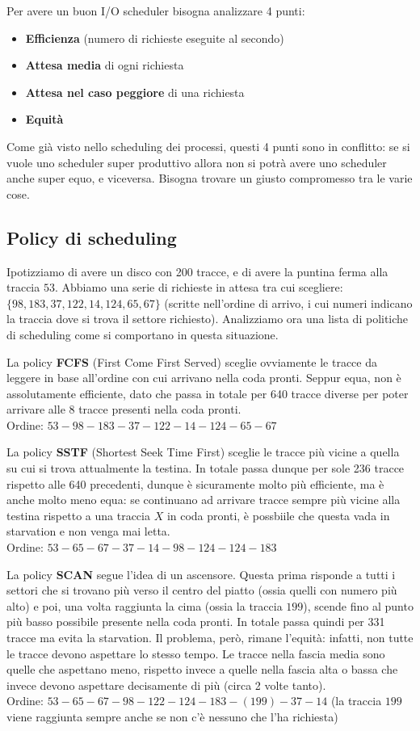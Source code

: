 \documentclass[11pt, a4paper, titlepage, oneside]{scrbook}
\begin{document}
Per avere un buon I/O scheduler bisogna analizzare 4 punti:
\begin{itemize}
    \item \textbf{Efficienza} (numero di richieste eseguite al secondo)
    \item \textbf{Attesa media} di ogni richiesta
    \item \textbf{Attesa nel caso peggiore} di una richiesta
    \item \textbf{Equità}
\end{itemize}

Come già visto nello scheduling dei processi, questi 4 punti sono in conflitto: se si vuole uno scheduler super produttivo allora non si potrà avere uno scheduler anche super equo, e viceversa. Bisogna trovare un giusto compromesso tra le varie cose. 

\subsection{Policy di scheduling}

Ipotizziamo di avere un disco con 200 tracce, e di avere la puntina ferma alla traccia $53$. Abbiamo una serie di richieste in attesa tra cui scegliere: $\{98,183,37,122,14,124,65,67\}$ (scritte nell'ordine di arrivo, i cui numeri indicano la traccia dove si trova il settore richiesto). Analizziamo ora una lista di politiche di scheduling come si comportano in questa situazione.

La policy \textbf{FCFS} (First Come First Served) sceglie ovviamente le tracce da leggere in base all'ordine con cui arrivano nella coda pronti. Seppur equa, non è assolutamente efficiente, dato che passa in totale per 640 tracce diverse per poter arrivare alle 8 tracce presenti nella coda pronti. \\
Ordine: $53-98-183-37-122-14-124-65-67$

La policy \textbf{SSTF} (Shortest Seek Time First) sceglie le tracce più vicine a quella su cui si trova attualmente la testina. In totale passa dunque per sole 236 tracce rispetto alle 640 precedenti, dunque è sicuramente molto più efficiente, ma è anche molto meno equa: se continuano ad arrivare tracce sempre più vicine alla testina rispetto a una traccia $X$ in coda pronti, è possbiile che questa vada in starvation e non venga mai letta.\\
Ordine: $53-65-67-37-14-98-124-124-183$

La policy \textbf{SCAN} segue l'idea di un ascensore. Questa prima risponde a tutti i settori che si trovano più verso il centro del piatto (ossia quelli con numero più alto) e poi, una volta raggiunta la cima (ossia la traccia $199$), scende fino al punto più basso possibile presente nella coda pronti. In totale passa quindi per 331 tracce ma evita la starvation. Il problema, però, rimane l'equità: infatti, non tutte le tracce devono aspettare lo stesso tempo. Le tracce nella fascia media sono quelle che aspettano meno, rispetto invece a quelle nella fascia alta o bassa che invece devono aspettare decisamente di più (circa 2 volte tanto). \\
Ordine: $53-65-67-98-122-124-183-(199)-37-14$ (la traccia $199$ viene raggiunta sempre anche se non c'è nessuno che l'ha richiesta)
\end{document}

